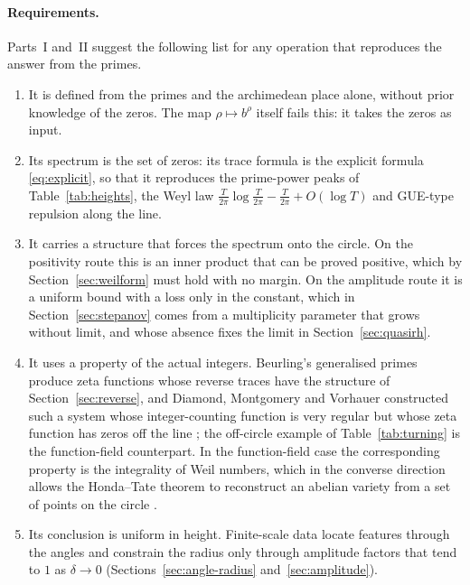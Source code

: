 \documentclass[11pt,a4paper]{article}
\theoremstyle{definition}\newtheorem{definition}[proposition]{Definition}
\theoremstyle{remark}\newtheorem{remark}[proposition]{Remark}
\begin{document}
\paragraph{Requirements.} Parts~I and~II suggest the following list for any operation that reproduces the answer from the primes.
\begin{enumerate}[label=(R\arabic*)]
\item It is defined from the primes and the archimedean place alone, without prior knowledge of the zeros. The map $\rho\mapsto b^\rho$ itself fails this: it takes the zeros as input.
\item Its spectrum is the set of zeros: its trace formula is the explicit formula \eqref{eq:explicit}, so that it reproduces the prime-power peaks of Table~\ref{tab:heights}, the Weyl law $\frac T{2\pi}\log\frac T{2\pi}-\frac T{2\pi}+O(\log T)$ and GUE-type repulsion along the line.
\item It carries a structure that forces the spectrum onto the circle. On the positivity route this is an inner product that can be proved positive, which by Section~\ref{sec:weilform} must hold with no margin. On the amplitude route it is a uniform bound with a loss only in the constant, which in Section~\ref{sec:stepanov} comes from a multiplicity parameter that grows without limit, and whose absence fixes the limit in Section~\ref{sec:quasirh}.
\item It uses a property of the actual integers. Beurling's generalised primes produce zeta functions whose reverse traces have the structure of Section~\ref{sec:reverse}, and Diamond, Montgomery and Vorhauer constructed such a system whose integer-counting function is very regular but whose zeta function has zeros off the line \cite{DMV2006}; the off-circle example of Table~\ref{tab:turning} is the function-field counterpart. In the function-field case the corresponding property is the integrality of Weil numbers, which in the converse direction allows the Honda--Tate theorem to reconstruct an abelian variety from a set of points on the circle \cite{Tate1966,Honda1968}.
\item Its conclusion is uniform in height. Finite-scale data locate features through the angles and constrain the radius only through amplitude factors that tend to $1$ as $\delta\to0$ (Sections~\ref{sec:angle-radius} and~\ref{sec:amplitude}).
\end{enumerate}
\end{document}
